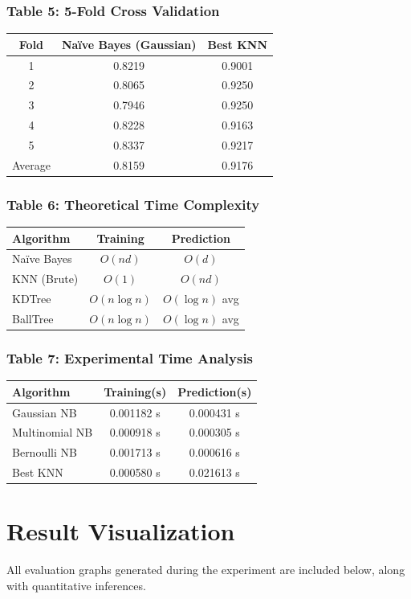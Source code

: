 \documentclass[12pt,a4paper]{article}
\begin{document}
\subsubsection*{Table 5: 5-Fold Cross Validation}
\begin{tabular}{ccc}
\toprule
Fold & Na\"ive Bayes (Gaussian) & Best KNN \\
\midrule
1 & 0.8219 & 0.9001 \\
2 & 0.8065 & 0.9250 \\
3 & 0.7946 & 0.9250 \\
4 & 0.8228 & 0.9163 \\
5 & 0.8337 & 0.9217 \\
\midrule
Average & 0.8159 & 0.9176 \\
\bottomrule
\end{tabular}

\subsubsection*{Table 6: Theoretical Time Complexity}
\begin{tabular}{lcc}
\toprule
Algorithm & Training & Prediction \\
\midrule
Na\"ive Bayes & $O(nd)$ & $O(d)$ \\
KNN (Brute) & $O(1)$ & $O(nd)$ \\
KDTree & $O(n \log n)$ & $O(\log n)$ avg \\
BallTree & $O(n \log n)$ & $O(\log n)$ avg \\
\bottomrule
\end{tabular}

\subsubsection*{Table 7: Experimental Time Analysis}
\begin{tabular}{lcc}
\toprule
Algorithm & Training(s) & Prediction(s) \\
\midrule
Gaussian NB & 0.001182 s & 0.000431 s \\
Multinomial NB & 0.000918 s & 0.000305 s \\
Bernoulli NB & 0.001713 s & 0.000616 s \\
Best KNN & 0.000580 s & 0.021613 s \\
\bottomrule
\end{tabular}

\section{Result Visualization}
All evaluation graphs generated during the experiment are included below, along with quantitative inferences.
\end{document}

